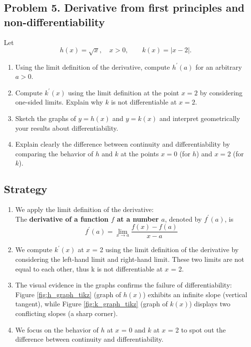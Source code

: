 \subsection{Problem 5. Derivative from first principles and non-differentiability}
Let
\[h(x)=\sqrt{x}, \quad x>0, \quad\quad k(x)=|x-2|.\]

\begin{enumerate}[label=(\alph*)]
    \item Using the limit definition of the derivative, compute $h^{\prime}(a)$ for an arbitrary $a>0$.
    \item Compute $k^{\prime}(x)$ using the limit definition at the point $x=2$ by considering one-sided limits. Explain why $k$ is not differentiable at $x=2$.
    \item Sketch the graphs of $y=h(x)$ and $y=k(x)$ and interpret geometrically your results about differentiability.
    \item Explain clearly the difference between continuity and differentiability by comparing the behavior of $h$ and $k$ at the points $x=0$ (for $h$) and $x=2$ (for $k$).
\end{enumerate}

\subsection*{Strategy}

\begin{enumerate}[label = (\alph*)] 

    \item We apply the limit definition of the derivative: \\
    The \textbf{derivative of a function $f$ at a number $a$}, denoted by $f^{\prime}(a)$, is 
    \begin{displaymath}
        f^{\prime}(a) = \lim_{x \to a} \frac{f(x) - f(a)}{x - a}
    \end{displaymath}
    
    \item We compute $k^{\prime}(x)$ at $x$ = 2 using the limit definition of the derivative by considering the left-hand limit and right-hand limit. These two limits are not equal to each other, thus k is not differentiable at $x$ = 2.
    
    \item The visual evidence in the graphs confirms the failure of differentiability: Figure \ref{fig:h_graph_tikz} (graph of $h(x)$) exhibits an infinite slope (vertical tangent), while Figure \ref{fig:k_graph_tikz} (graph of $k(x)$) displays two conflicting slopes (a sharp corner).
    
    \item We focus on the behavior of $h$ at $x$ = 0 and $k$ at $x$ = 2 to spot out the difference between continuity and differentiability.
\end{enumerate}
